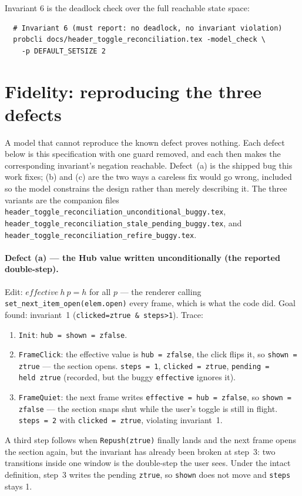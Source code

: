 \documentclass[a4paper,10pt,fleqn]{article}
\begin{document}
Invariant 6 is the deadlock check over the full reachable state space:
\begin{verbatim}
  # Invariant 6 (must report: no deadlock, no invariant violation)
  probcli docs/header_toggle_reconciliation.tex -model_check \
    -p DEFAULT_SETSIZE 2
\end{verbatim}

\section{Fidelity: reproducing the three defects}
\label{sec:fidelity}

A model that cannot reproduce the known defect proves nothing.  Each defect
below is this specification with one guard removed, and each then makes the
corresponding invariant's negation reachable.  Defect~(a) is the shipped bug
this work fixes; (b) and (c) are the two ways a careless fix would go wrong,
included so the model constrains the design rather than merely describing it.
The three variants are the companion files
\texttt{header\_toggle\_reconciliation\_unconditional\_buggy.tex},
\texttt{header\_toggle\_reconciliation\_stale\_pending\_buggy.tex}, and
\texttt{header\_toggle\_reconciliation\_refire\_buggy.tex}.

\paragraph{Defect (a) --- the Hub value written unconditionally (the reported
double-step).}
Edit: $effective~h~p = h$ for all $p$ --- the renderer calling
\texttt{set\_next\_item\_open(elem.open)} every frame, which is what the code
did.  Goal found: invariant~1 (\texttt{clicked=ztrue \& steps>1}).  Trace:
\begin{enumerate}
  \item \texttt{Init}: \texttt{hub = shown = zfalse}.
  \item \texttt{FrameClick}: the effective value is \texttt{hub = zfalse}, the
    click flips it, so \texttt{shown = ztrue} --- the section opens.
    \texttt{steps = 1}, \texttt{clicked = ztrue}, \texttt{pending = held~ztrue}
    (recorded, but the buggy \texttt{effective} ignores it).
  \item \texttt{FrameQuiet}: the next frame writes \texttt{effective = hub =
    zfalse}, so \texttt{shown = zfalse} --- the section snaps shut while the
    user's toggle is still in flight.  \texttt{steps = 2} with
    \texttt{clicked = ztrue}, violating invariant~1.
\end{enumerate}
A third step follows when \texttt{Repush(ztrue)} finally lands and the next
frame opens the section again, but the invariant has already been broken at
step~3: two transitions inside one window is the double-step the user sees.
Under the intact definition, step~3 writes the pending \texttt{ztrue}, so \texttt{shown} does not move and \texttt{steps} stays 1.
\end{document}
